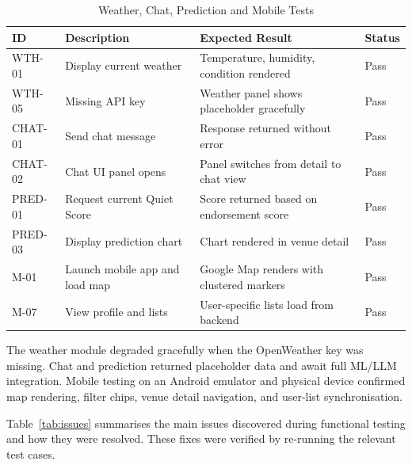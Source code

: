 \documentclass[conference]{IEEEtran}
\begin{document}
\begin{table}[htbp]
\caption{Weather, Chat, Prediction and Mobile Tests}
\label{tab:supporting}
\begin{center}
\scriptsize
\setlength{\tabcolsep}{1pt}
\begin{tabular}{@{}|p{}|p{}|p{}|p{}|@{}}
\hline
\textbf{ID} & \textbf{Description} & \textbf{Expected Result} & \textbf{Status} \\
\hline
WTH-01 & Display current weather & Temperature, humidity, condition rendered & Pass \\
\hline
WTH-05 & Missing API key & Weather panel shows placeholder gracefully & Pass \\
\hline
CHAT-01 & Send chat message & Response returned without error & Pass \\
\hline
CHAT-02 & Chat UI panel opens & Panel switches from detail to chat view & Pass \\
\hline
PRED-01 & Request current Quiet Score & Score returned based on endorsement score & Pass \\
\hline
PRED-03 & Display prediction chart & Chart rendered in venue detail & Pass \\
\hline
M-01 & Launch mobile app and load map & Google Map renders with clustered markers & Pass \\
\hline
M-07 & View profile and lists & User-specific lists load from backend & Pass \\
\hline
\end{tabular}
\end{center}
\end{table}

The weather module degraded gracefully when the OpenWeather key was missing. Chat and prediction returned placeholder data and await full ML/LLM integration. Mobile testing on an Android emulator and physical device confirmed map rendering, filter chips, venue detail navigation, and user-list synchronisation.

Table~\ref{tab:issues} summarises the main issues discovered during functional testing and how they were resolved. These fixes were verified by re-running the relevant test cases.
\end{document}
